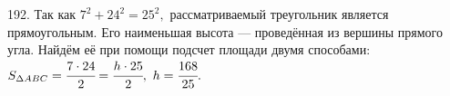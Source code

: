 192. Так как $7^2+24^2=25^2,$ рассматриваемый треугольник является прямоугольным. Его наименьшая высота --- проведённая из вершины прямого угла. Найдём её при помощи подсчет площади двумя способами: $S_{\Delta ABC}=\cfrac{7\cdot24}{2}=\cfrac{h\cdot25}{2},\ h=\cfrac{168}{25}.$\\
